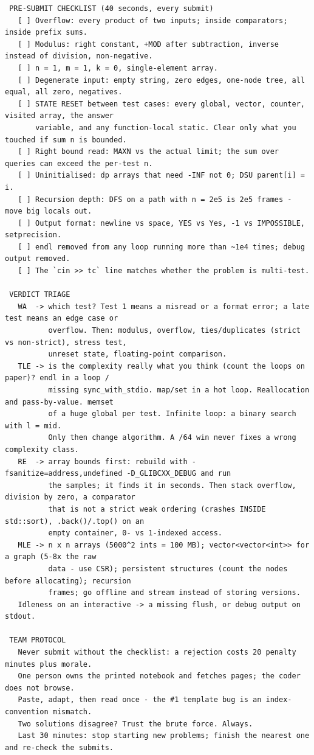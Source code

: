 \documentclass[9pt,a4paper,twocolumn]{extarticle}
\begin{document}
\begin{lstlisting}
 PRE-SUBMIT CHECKLIST (40 seconds, every submit)
   [ ] Overflow: every product of two inputs; inside comparators; inside prefix sums.
   [ ] Modulus: right constant, +MOD after subtraction, inverse instead of division, non-negative.
   [ ] n = 1, m = 1, k = 0, single-element array.
   [ ] Degenerate input: empty string, zero edges, one-node tree, all equal, all zero, negatives.
   [ ] STATE RESET between test cases: every global, vector, counter, visited array, the answer
       variable, and any function-local static. Clear only what you touched if sum n is bounded.
   [ ] Right bound read: MAXN vs the actual limit; the sum over queries can exceed the per-test n.
   [ ] Uninitialised: dp arrays that need -INF not 0; DSU parent[i] = i.
   [ ] Recursion depth: DFS on a path with n = 2e5 is 2e5 frames - move big locals out.
   [ ] Output format: newline vs space, YES vs Yes, -1 vs IMPOSSIBLE, setprecision.
   [ ] endl removed from any loop running more than ~1e4 times; debug output removed.
   [ ] The `cin >> tc` line matches whether the problem is multi-test.

 VERDICT TRIAGE
   WA  -> which test? Test 1 means a misread or a format error; a late test means an edge case or
          overflow. Then: modulus, overflow, ties/duplicates (strict vs non-strict), stress test,
          unreset state, floating-point comparison.
   TLE -> is the complexity really what you think (count the loops on paper)? endl in a loop /
          missing sync_with_stdio. map/set in a hot loop. Reallocation and pass-by-value. memset
          of a huge global per test. Infinite loop: a binary search with l = mid.
          Only then change algorithm. A /64 win never fixes a wrong complexity class.
   RE  -> array bounds first: rebuild with -fsanitize=address,undefined -D_GLIBCXX_DEBUG and run
          the samples; it finds it in seconds. Then stack overflow, division by zero, a comparator
          that is not a strict weak ordering (crashes INSIDE std::sort), .back()/.top() on an
          empty container, 0- vs 1-indexed access.
   MLE -> n x n arrays (5000^2 ints = 100 MB); vector<vector<int>> for a graph (5-8x the raw
          data - use CSR); persistent structures (count the nodes before allocating); recursion
          frames; go offline and stream instead of storing versions.
   Idleness on an interactive -> a missing flush, or debug output on stdout.

 TEAM PROTOCOL
   Never submit without the checklist: a rejection costs 20 penalty minutes plus morale.
   One person owns the printed notebook and fetches pages; the coder does not browse.
   Paste, adapt, then read once - the #1 template bug is an index-convention mismatch.
   Two solutions disagree? Trust the brute force. Always.
   Last 30 minutes: stop starting new problems; finish the nearest one and re-check the submits.


\end{lstlisting}
\end{document}
